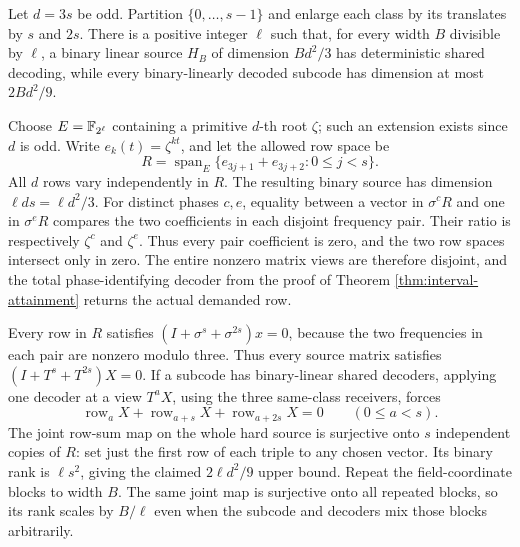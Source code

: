 \begin{lemma}\label{lem:triple-obstruction}
Let $d=3s$ be odd. Partition $\{0,\ldots,s-1\}$ and enlarge each class
by its translates by $s$ and $2s$. There is a positive integer $\ell$
such that, for every width $B$ divisible by $\ell$, a binary linear source
$H_B$ of dimension $Bd^2/3$ has deterministic shared decoding, while
every binary-linearly decoded subcode has dimension at most $2Bd^2/9$.
\end{lemma}
\begin{outline}
Choose $E=\mathbb{F}_{2^\ell}$ containing a primitive $d$-th root $\zeta$;
such an extension exists since $d$ is odd. Write
$e_k(t)=\zeta^{kt}$, and let the allowed row space be
\[
 R=\operatorname{span}_E\{e_{3j+1}+e_{3j+2}:0\le j<s\}.
\]
All $d$ rows vary independently in $R$. The resulting binary source has
dimension $\ell ds=\ell d^2/3$. For distinct phases $c,e$, equality
between a vector in $\sigma^cR$ and one in $\sigma^eR$ compares the two
coefficients in each disjoint frequency pair. Their ratio is respectively
$\zeta^c$ and $\zeta^e$. Thus every pair coefficient is zero, and the two
row spaces intersect only in zero. The entire nonzero matrix views are
therefore disjoint, and the total phase-identifying decoder from the proof
of Theorem \ref{thm:interval-attainment} returns the actual demanded row.

Every row in $R$ satisfies $(I+\sigma^s+\sigma^{2s})x=0$, because the
two frequencies in each pair are nonzero modulo three. Thus every
source matrix satisfies $(I+T^s+T^{2s})X=0$. If a subcode has binary-linear
shared decoders, applying one decoder at a view $T^aX$, using the three
same-class receivers, forces
\[
 \operatorname{row}_aX+\operatorname{row}_{a+s}X+
 \operatorname{row}_{a+2s}X=0\qquad(0\le a<s).
\]
The joint row-sum map on the whole hard source is surjective onto $s$
independent copies of $R$: set just the first row of each triple to any
chosen vector. Its binary rank is $\ell s^2$, giving the claimed
$2\ell d^2/9$ upper bound. Repeat the field-coordinate blocks to width
$B$. The same joint map is surjective onto all repeated blocks, so its
rank scales by $B/\ell$ even when the subcode and decoders mix those
blocks arbitrarily.
\end{outline}

